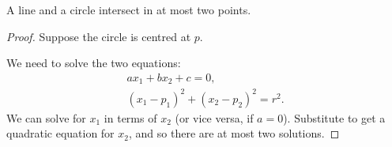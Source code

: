 \begin{proposition}
	A line and a circle intersect in at most two points. %
\end{proposition}

\begin{proof}
	Suppose the circle is centred at $p$.

	We need to solve the two equations:
	\begin{gather*}
		ax_1 + bx_2 + c = 0, \tag{line} \\
		\left( x_1-p_1 \right)^2 + \left( x_2-p_2 \right)^2 = r^2. \tag{circle}
	\end{gather*}
	We can solve for $x_1$ in terms of $x_2$ (or vice versa, if $a=0$). Substitute to get a quadratic equation for $x_2$, and so there are at most two solutions. %
\end{proof}

